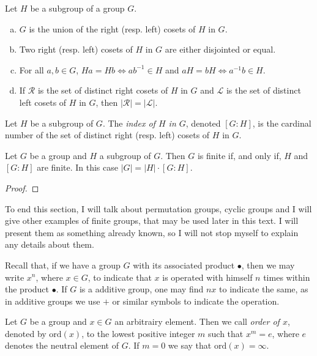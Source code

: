 \documentclass[../main.tex]{subfiles}
\begin{document}
\begin{coro}
Let $H$ be a subgroup of a group $G$.
\begin{enumerate}[(a)]
    \item $G$ is the union of the right (resp. left) cosets of $H$ in $G$.
    \item Two right (resp. left) cosets of $H$ in $G$ are either disjointed or equal.
    \item For all $a,b\in G$, $Ha = Hb\Leftrightarrow ab^{-1}\in H$ and $aH = bH\Leftrightarrow a^{-1}b\in H$.
    \item If $\mathcal{R}$ is the set of distinct right cosets of $H$ in $G$ and $\mathcal{L}$ is the set of distinct left cosets of $H$ in $G$, then $|\mathcal{R}| = |\mathcal{L}|$.
\end{enumerate}
\end{coro}



\begin{defi}
[Index] Let $H$ be a subgroup of $G$. The \textit{index of $H$ in $G$}, denoted $[G:H]$, is the cardinal number of the set of distinct right (resp. left) cosets of $H$ in $G$.
\end{defi}

\begin{ter}[Lagrange]\label{ter:lagrange}
Let $G$ be a group and $H$ a subgroup of $G$. Then $G$ is finite if, and only if, $H$ and $[G:H]$ are finite. In this case $|G| = |H|\cdotp[G:H]$.
\end{ter}
\begin{proof}
\noproof
\end{proof}


To end this section, I will talk about permutation groups, cyclic groups and I will give other examples of finite groups, that may be used later in this text. I will present them as something already known, so I will not stop myself to explain any details about them.

Recall that, if we have a group $G$ with its associated product $\bullet$, then we may write $x^n$, where $x\in G$, to indicate that $x$ is operated with himself $n$ times within the product $\bullet$. If $G$ is a additive group, one may find $nx$ to indicate the same, as in additive groups we use $+$ or similar symbols to indicate the operation. 

\begin{defi}
 Let $G$ be a group and $x\in G$ an arbitrairy element. Then we call \textit{order of $x$}, denoted by $\mathrm{ord}(x)$, to the lowest positive integer $m$ such that $x^m = e$, where $e$ denotes the neutral element of $G$. If $m = 0$ we say that $\mathrm{ord}(x) = \infty$.
\end{defi}
\end{document}
